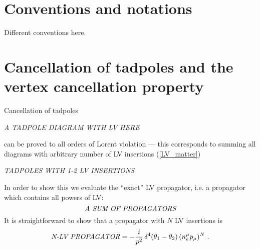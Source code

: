 \documentclass[a4paper,12pt]{article}
\begin{document}
\newpage
\appendix

\section{Conventions and notations}
\label{app_conventions}

	Different conventions here.

\section{Cancellation of tadpoles and 
 	the vertex cancellation property}
\label{app_cancellation}

	Cancellation of tadpoles 

\emph{A TADPOLE DIAGRAM WITH LV HERE}

	can be proved to all orders of Lorent violation ---
	this corresponds to summing all diagrams with arbitrary
	number of LV insertions (\ref{LV_matter})

\emph{TADPOLES WITH 1-2 LV INSERTIONS}
	
	In order to show this we evaluate the ``exact'' LV 
	propagator, i.e. a propagator which contains all powers
	of LV:
\begin{equation}
\label{def_full_prop}
\emph{A SUM OF PROPAGATORS}
\end{equation}
	It is straightforward to show that a propagator with $ N $
	LV insertions is
\begin{equation}
\label{N_LV_prop}
\emph{N-LV PROPAGATOR} = 
	- \frac{i}{p^2}\, \delta^4(\theta_1 - \theta_2)\,
	    (n_e^\mu p_\mu)^N  
	~.
\end{equation}
\end{document}
